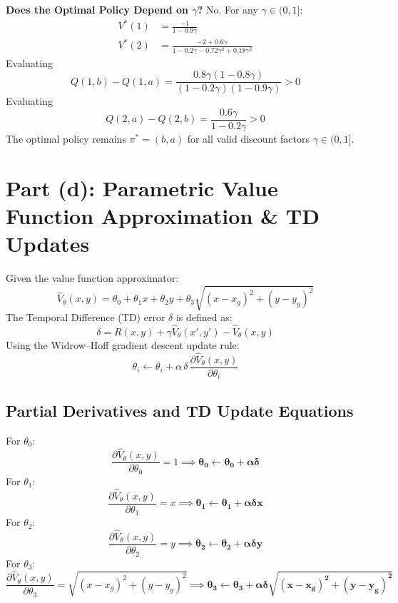 \documentclass[11pt]{article}
\begin{document}
\textbf{Does the Optimal Policy Depend on $\gamma$?} No. For any $\gamma \in (0, 1]$:
\begin{align*}
V^*(1) &= \frac{-1}{1 - 0.9\gamma} \\
V^*(2) &= \frac{-2 + 0.6\gamma}{1 - 0.2\gamma - 0.72\gamma^2 + 0.18\gamma^2}
\end{align*}
Evaluating
\[
Q(1, b) - Q(1, a) = \frac{0.8\gamma(1 - 0.8\gamma)}{(1 - 0.2\gamma)(1 - 0.9\gamma)} > 0
\]
Evaluating
\[
Q(2, a) - Q(2, b) = \frac{0.6\gamma}{1 - 0.2\gamma} > 0
\]
The optimal policy remains $\pi^* = (b, a)$ for all valid discount factors $\gamma \in (0, 1]$.

\section*{Part (d): Parametric Value Function Approximation \& TD Updates}

Given the value function approximator:
\[
\hat{V}_\theta(x, y) = \theta_0 + \theta_1 x + \theta_2 y + \theta_3 \sqrt{(x - x_g)^2 + (y - y_g)^2}
\]
The Temporal Difference (TD) error $\delta$ is defined as:
\[
\delta = R(x, y) + \gamma \hat{V}_\theta(x', y') - \hat{V}_\theta(x, y)
\]
Using the Widrow--Hoff gradient descent update rule:
\[
\theta_i \leftarrow \theta_i + \alpha\, \delta\, \frac{\partial \hat{V}_\theta(x, y)}{\partial \theta_i}
\]

\subsection*{Partial Derivatives and TD Update Equations}

For $\theta_0$:
\[
\frac{\partial \hat{V}_\theta(x, y)}{\partial \theta_0} = 1 \implies \boldsymbol{\theta_0 \leftarrow \theta_0 + \alpha \delta}
\]
For $\theta_1$:
\[
\frac{\partial \hat{V}_\theta(x, y)}{\partial \theta_1} = x \implies \boldsymbol{\theta_1 \leftarrow \theta_1 + \alpha \delta x}
\]
For $\theta_2$:
\[
\frac{\partial \hat{V}_\theta(x, y)}{\partial \theta_2} = y \implies \boldsymbol{\theta_2 \leftarrow \theta_2 + \alpha \delta y}
\]
For $\theta_3$:
\[
\frac{\partial \hat{V}_\theta(x, y)}{\partial \theta_3} = \sqrt{(x - x_g)^2 + (y - y_g)^2} \implies \boldsymbol{\theta_3 \leftarrow \theta_3 + \alpha \delta \sqrt{(x - x_g)^2 + (y - y_g)^2}}
\]
\end{document}
